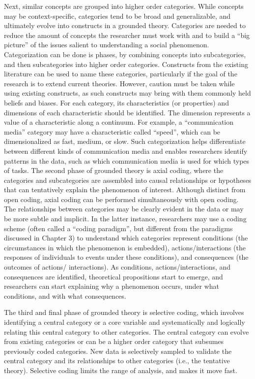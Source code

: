 Next, similar concepts are grouped into higher order categories. While concepts may be context-specific, categories tend to be broad and generalizable, and ultimately evolve into constructs in a grounded theory. Categories are needed to reduce the amount of concepts the researcher must work with and to build a “big picture” of the issues salient to understanding a social phenomenon. Categorization can be done is phases, by combining concepts into subcategories, and then subcategories into higher order categories. Constructs from the existing literature can be used to name these categories, particularly if the goal of the research is to extend current theories. However, caution must be taken while using existing constructs, as such constructs may bring with them commonly held beliefs and biases. For each category, its characteristics (or properties) and dimensions of each characteristic should be identified. The dimension represents a value of a characteristic along a continuum. For example, a “communication media” category may have a characteristic called “speed”, which can be dimensionalized as fast, medium, or slow. Such categorization helps differentiate between different kinds of communication media and enables researchers identify patterns in the data, such as which communication media is used for which types of tasks. The second phase of grounded theory is axial coding, where the categories and subcategories are assembled into causal relationships or hypotheses that can tentatively explain the phenomenon of interest. Although distinct from open coding, axial coding can be performed simultaneously with open coding. The relationships between categories may be clearly evident in the data or may be more subtle and implicit. In the latter instance, researchers may use a coding scheme (often called a “coding paradigm”, but different from the paradigms discussed in Chapter 3) to understand which categories represent conditions (the circumstances in which the phenomenon is embedded), actions/interactions (the responses of individuals to events under these conditions), and consequences (the outcomes of actions/ interactions). As conditions, actions/interactions, and consequences are identified, theoretical propositions start to emerge, and researchers can start explaining why a phenomenon occurs, under what conditions, and with what consequences.

The third and final phase of grounded theory is selective coding, which involves identifying a central category or a core variable and systematically and logically relating this central category to other categories. The central category can evolve from existing categories or can be a higher order category that subsumes previously coded categories. New data is selectively sampled to validate the central category and its relationships to other categories (i.e., the tentative theory). Selective coding limits the range of analysis, and makes it move fast. 

